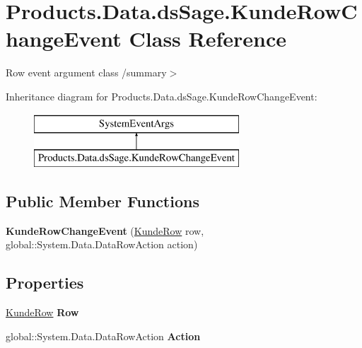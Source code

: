 \hypertarget{class_products_1_1_data_1_1ds_sage_1_1_kunde_row_change_event}{}\section{Products.\+Data.\+ds\+Sage.\+Kunde\+Row\+Change\+Event Class Reference}
\label{class_products_1_1_data_1_1ds_sage_1_1_kunde_row_change_event}


Row event argument class /summary$>$  


Inheritance diagram for Products.\+Data.\+ds\+Sage.\+Kunde\+Row\+Change\+Event\+:\begin{figure}[H]
\begin{center}
\leavevmode
\includegraphics[height=2.000000cm]{class_products_1_1_data_1_1ds_sage_1_1_kunde_row_change_event}
\end{center}
\end{figure}
\subsection*{Public Member Functions}
\begin{DoxyCompactItemize}
\item 
{\bfseries Kunde\+Row\+Change\+Event} (\hyperlink{class_products_1_1_data_1_1ds_sage_1_1_kunde_row}{Kunde\+Row} row, global\+::\+System.\+Data.\+Data\+Row\+Action action)\hypertarget{class_products_1_1_data_1_1ds_sage_1_1_kunde_row_change_event_a69db37d0e4ce5a097e3c8951613d6bc8}{}\label{class_products_1_1_data_1_1ds_sage_1_1_kunde_row_change_event_a69db37d0e4ce5a097e3c8951613d6bc8}

\end{DoxyCompactItemize}
\subsection*{Properties}
\begin{DoxyCompactItemize}
\item 
\hyperlink{class_products_1_1_data_1_1ds_sage_1_1_kunde_row}{Kunde\+Row} {\bfseries Row}\hypertarget{class_products_1_1_data_1_1ds_sage_1_1_kunde_row_change_event_a134f5bb4f3c31aabc11c954f648a0fd3}{}\label{class_products_1_1_data_1_1ds_sage_1_1_kunde_row_change_event_a134f5bb4f3c31aabc11c954f648a0fd3}

\item 
global\+::\+System.\+Data.\+Data\+Row\+Action {\bfseries Action}\hypertarget{class_products_1_1_data_1_1ds_sage_1_1_kunde_row_change_event_adf95b67ffef5cec82600d2581d0c1f4d}{}\label{class_products_1_1_data_1_1ds_sage_1_1_kunde_row_change_event_adf95b67ffef5cec82600d2581d0c1f4d}

\end{DoxyCompactItemize}


